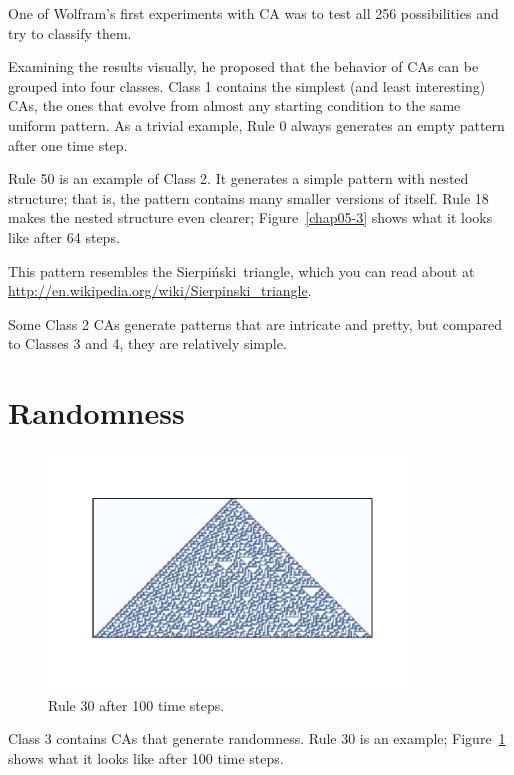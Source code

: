 \documentclass[12pt]{book}
\theoremstyle{exercise}
\begin{document}
One of Wolfram's first experiments with CA was to test all 256
possibilities and try to classify them.

Examining the results visually, he proposed that the behavior of CAs
can be grouped into four classes.  Class 1 contains the simplest (and
least interesting) CAs, the ones that evolve from almost any starting
condition to the same uniform pattern.  As a trivial example, Rule 0
always generates an empty pattern after one time step.


Rule 50 is an example of Class 2.  It generates a simple pattern with
nested structure; that is, the pattern contains many smaller versions
of itself.  Rule 18 makes the nested structure even clearer;
Figure~\ref{chap05-3} shows what it looks like after 64 steps.


\newcommand{\Sierpinski}{Sierpi\'{n}ski}

This pattern resembles the \Sierpinski~triangle, which
you can read about at \url{http://en.wikipedia.org/wiki/Sierpinski_triangle}.

Some Class 2 CAs generate patterns that are intricate and
pretty, but compared to Classes 3 and 4, they are relatively
simple.


\section{Randomness}

\begin{figure}
\centerline{\includegraphics[height=2.5in]{figs/chap05-4.pdf}}
\caption{Rule 30 after 100 time steps.}
\label{chap05-4}
\end{figure}

Class 3 contains CAs that generate randomness.
Rule 30 is an example; Figure~\ref{chap05-4} shows what it looks like
after 100 time steps.
\end{document}
